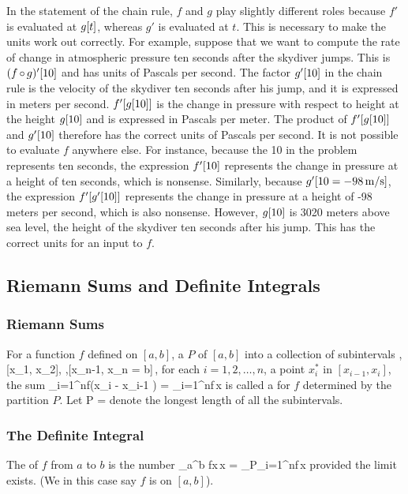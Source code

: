 In the statement of the chain rule, $f$ and $g$ play slightly different roles because $f'$ is evaluated at $g\!\left[{t}\right]$, whereas $g'$ is evaluated at $t$. This is necessary to make the units work out correctly. For example, suppose that we want to compute the rate of change in atmospheric pressure ten seconds after the skydiver jumps. This is $(f\operatorname{\circ} g)'\!\left[{10}\right]$ and has units of Pascals per second. The factor $g'\!\left[{10}\right]$ in the chain rule is the velocity of the skydiver ten seconds after his jump, and it is expressed in meters per second. $f'\!\left[{g\!\left[{10}\right]}\right]$ is the change in pressure with respect to height at the height $g\!\left[{10}\right]$ and is expressed in Pascals per meter. The product of $f'\!\left[{g\!\left[{10}\right]}\right]$ and $g'\!\left[{10}\right]$ therefore has the correct units of Pascals per second. It is not possible to evaluate $f$ anywhere else. For instance, because the 10 in the problem represents ten seconds, the expression $f'\!\left[{10}\right]$ represents the change in pressure at a height of ten seconds, which is nonsense. Similarly, because $g'\!\left[{10 = -\SI{98}{m/s}}\right]$, the expression $f'\!\left[{g'\!\left[{10}\right]}\right]$ represents the change in pressure at a height of -98 meters per second, which is also nonsense. However, $g\!\left[{10}\right]$ is 3020 meters above sea level, the height of the skydiver ten seconds after his jump. This has the correct units for an input to $f$.


\subsection{Riemann Sums and Definite Integrals}

\subsubsection{Riemann Sums}
For a function $f$ defined on $[a,b]$, a  $P$ of $[a,b]$ into a collection of subintervals
\beq
[a=x_0, x_1],\,[x_1, x_2],\,\dotsc\,,[x_{n-1}, x_n = b]\,,
\eeq
for each $i = 1,2,\dotsc,n$, a point $x_i^*$ in $[x_{i-1},x_i]$, the sum
\beq
\sum_{i=1}^{n}f\left(x_i - x_{i-1} \right) = \sum_{i=1}^{n}f\,\diff x
\eeq
is called a  for $f$ determined by the partition $P$. Let 
\beq
\magn P = \max{}
\eeq
denote the longest length of all the subintervals.


\subsubsection{The Definite Integral}
The  of $f$ from $a$ to $b$ is the number
\beq
\int_a^b f\vat x\,\dx x = \lim_{\magn P}\sum_{i=1}^{n}f\,\diff x
\eeq
provided the limit exists. (We in this case say $f$ is  on $[a,b]$).


